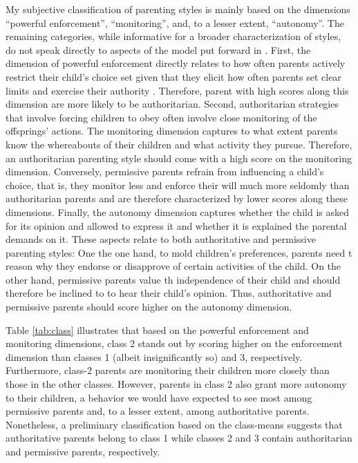 My subjective classification of parenting styles is mainly based on the dimensions ``powerful enforcement'', ``monitoring'', and, to a lesser extent, ``autonomy''. The remaining categories, while informative for a broader characterization of styles, do not speak directly to aspects of the model put forward in \textcite{doepkeParentingStyleAltruism2017}. First, the dimension of powerful enforcement directly relates to how often parents actively restrict their child's choice set given that they elicit how often parents set clear limits and exercise their authority \parencite{arteltNEPSStartingCohort2021}. Therefore, parent with high scores along this dimension are more likely to be authoritarian. Second, authoritarian strategies that involve forcing children to obey often involve close monitoring of the offsprings' actions. The monitoring dimension captures to what extent parents know the whereabouts of their children and what activity they pursue. Therefore, an authoritarian parenting style should come with a high score on the monitoring dimension. Conversely, permissive parents refrain from influencing a child's choice, that is, they monitor less and enforce their will much more seldomly than authoritarian parents and are therefore characterized by lower scores along these dimensions. Finally, the autonomy dimension captures whether the child is asked for its opinion and allowed to express it and whether it is explained the parental demands on it. These aspects relate to both authoritative and permissive parenting styles: One the one hand, to mold children's preferences, parents need t reason why they endorse or disapprove of certain activities of the child. On the other hand, permissive parents value th independence of their child and should therefore be inclined to to hear their child's opinion. Thus, authoritative and permissive parents should score higher on the autonomy dimension.

Table \ref{tab:class} illustrates that based on the powerful enforcement and monitoring dimensions, class 2 stands out by scoring higher on the enforcement dimension than classes 1 (albeit insignificantly so) and 3, respectively. Furthermore, class-2 parents are monitoring their children more closely than those in the other classes. However, parents in class 2 also grant more autonomy to their children, a behavior we would have expected to see most among permissive parents and, to a lesser extent, among authoritative parents. Nonetheless, a preliminary classification based on the class-means suggests that authoritative parents belong to class 1 while classes 2 and 3 contain authoritarian and permissive parents, respectively. 


